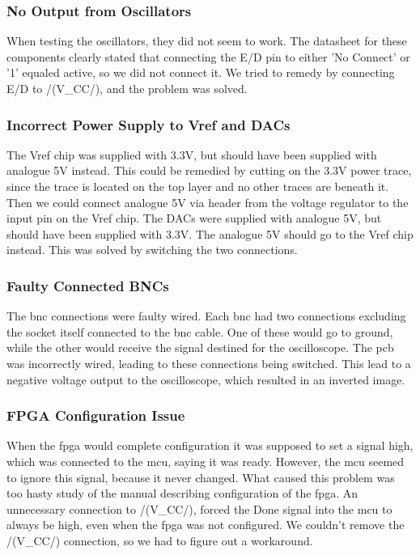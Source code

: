 \subsubsection{No Output from Oscillators}
When testing the oscillators, they did not seem to work. The datasheet for these components clearly stated that connecting the E/D pin to either 'No Connect' or '1' equaled active, so we did not connect it. We tried to remedy by connecting E/D to /(V_{CC}/), and the problem was solved.

\subsubsection{Incorrect Power Supply to Vref and DACs}
The Vref chip was supplied with 3.3V, but should have been supplied with analogue 5V instead. This could be remedied by cutting on the 3.3V power trace, since the trace is located on the top layer and no other traces are beneath it. Then we could connect analogue 5V via header from the voltage regulator to the input pin on the Vref chip.
\newline
The DACs were supplied with analogue 5V, but should have been supplied with 3.3V. The analogue 5V should go to the Vref chip instead. This was solved by switching the two connections.

\subsubsection{Faulty Connected BNCs}
The \gls{bnc} connections were faulty wired. Each \gls{bnc} had two connections excluding the socket itself connected to the \gls{bnc} cable. One of these would go to ground, while the other would receive the signal destined for the oscilloscope. The \gls{pcb} was incorrectly wired, leading to these connections being switched. This lead to a negative voltage output to the oscilloscope, which resulted in an inverted image. 

\subsubsection{FPGA Configuration Issue}
When the \gls{fpga} would complete configuration it was supposed to set a signal high, which was connected to the \gls{mcu}, saying it was ready. However, the \gls{mcu} seemed to ignore this signal, because it never changed. What caused this problem was too hasty study of the manual describing configuration of the \gls{fpga}.
An unnecessary connection to /(V_{CC}/), forced the Done signal into the \gls{mcu} to always be high, even when the \gls{fpga} was not configured. We couldn't remove the /(V_{CC}/) connection, so we had to figure out a workaround.

